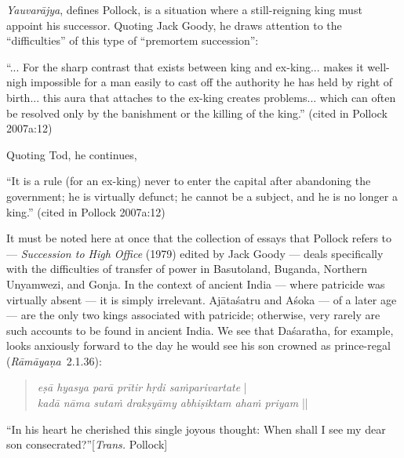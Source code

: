 {\sl Yauvarājya}, defines Pollock, is a situation where a still-reigning king must appoint his successor. Quoting Jack Goody, he draws attention to the “difficulties” of this type of “premortem succession”:

\begin{myquote}
 “... For the sharp contrast that exists between king and ex-king... makes it well-nigh impossible for a man easily to cast off the authority he has held by right of birth... this aura that attaches to the ex-king creates problems... which can often be resolved only by the banishment or the killing of the king.” 
\hfill (cited in Pollock 2007a:12)
\end{myquote}

Quoting Tod, he continues,

\begin{myquote}
“It is a rule (for an ex-king) never to enter the capital after abandoning the government; he is virtually defunct; he cannot be a subject, and he is no longer a king.”
\hfill (cited in Pollock 2007a:12)
\end{myquote}

It must be noted here at once that the collection of essays that Pollock refers to --- {\sl Succession to High Office} (1979) edited by Jack Goody --- deals specifically with the difficulties of transfer of power in Basutoland, Buganda, Northern Unyamwezi, and Gonja. In the context of ancient India --- where patricide was virtually absent --- it is simply irrelevant. Ajātaśatru and Aśoka — of a later age — are the only two kings associated with patricide; otherwise, very rarely are such accounts to be found in ancient India. We see that Daśaratha, for example, looks anxiously forward to the day he would see his son crowned as prince-regal ({{\sl Rāmāyaṇa}}\relax \ 2.1.36):
\begin{quote}
{{\sl eṣā hyasya parā prītir\label{verse6} hṛdi saṁparivartate}} |\\
{{\sl kadā nāma sutaṁ drakṣyāmy abhiṣiktam ahaṁ priyam}} || 
\end{quote}

\begin{myquote}
“In his heart he cherished this single joyous thought: When shall I see my dear son consecrated?”\hfill [{\sl Trans.} Pollock]
\end{myquote}

